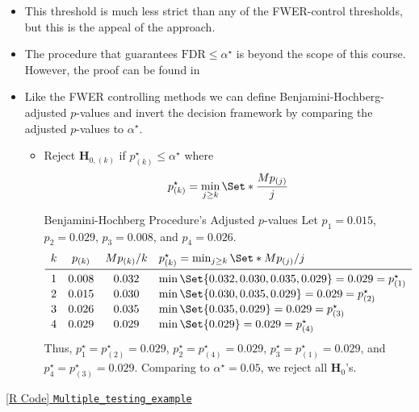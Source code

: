 \begin{itemize}
          \begin{Example}{Four-test Example --- Benjamini-Hochberg Procedure}{}
              Let $ p_1=0.015 $, $ p_2=0.029 $, $ p_3=0.008 $, and $ p_4=0.026 $. Suppose that we wish to ensure
              $ \FDR\le \alpha^\star=0.05 $. Since all $ p $-values fall below the purple line in~,
              we reject all four null hypotheses.
          \end{Example}
    \item This threshold is much less strict than any of the FWER-control thresholds, but this is the appeal of
          the approach.
    \item The procedure that guarantees $ \text{FDR}\le \alpha^\star $ is beyond the scope of this course.
          However, the proof can be found in%
    \item Like the FWER controlling methods we can define Benjamini-Hochberg-adjusted $p$-values and invert
          the decision framework by comparing the adjusted $ p $-values to $ \alpha^\star $.
          \begin{itemize}
              \item Reject $ \mathbf{H}_{0,(k)} $ if $ p_{(k)}^\star\le \alpha^\star $ where
                    \[ p_{(k)}^\star=\min_{j\ge k}\Set*{\frac{Mp_{(j)}}{j}} \]
                    \begin{Example}{Benjamini-Hochberg Procedure's Adjusted $ p $-values}{}
                        Let $ p_1=0.015 $, $ p_2=0.029 $, $ p_3=0.008 $, and $ p_4=0.026 $.
                        \[ \begin{array}{cccl}
                                k & p_{(k)} & M p_{(k)}/k & p_{(k)}^\star=\min_{j\ge k}\Set*{Mp_{(j)}/j}          \\
                                \midrule
                                1 & 0.008   & 0.032       & \min\Set{0.032,0.030,0.035,0.029}=0.029=p_{(1)}^\star \\
                                2 & 0.015   & 0.030       & \min\Set{0.030,0.035,0.029}=0.029=p_{(2)}^\star       \\
                                3 & 0.026   & 0.035       & \min\Set{0.035,0.029}=0.029=p_{(3)}^\star             \\
                                4 & 0.029   & 0.029       & \min\Set{0.029}=0.029=p_{(4)}^\star
                            \end{array} \]
                        Thus, $ p_1^\star=p_{(2)}^\star=0.029 $, $ p_2^\star=p_{(4)}^\star=0.029 $, $ p_3^\star=p_{(1)}^\star=0.029 $,
                        and $ p_4^\star=p_{(3)}^\star=0.029 $. Comparing to $ \alpha^\star=0.05 $,
                        we reject all $ \mathbf{H}_{0} $'s.
                    \end{Example}
          \end{itemize}
\end{itemize}
\href{https://github.com/Hextical/university-notes/blob/master/year-3/semester-3/STAT 430/code/W4/Multiple_testing_example.R}{[R Code] \texttt{Multiple\_testing\_example}}
